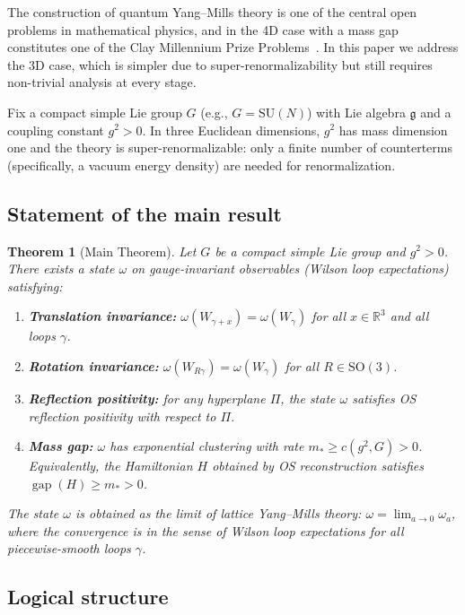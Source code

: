 \documentclass[11pt,a4paper]{article}
\theoremstyle{plain}
\newtheorem{theorem}{Theorem}[section]
\theoremstyle{definition}
\theoremstyle{remark}
\newcommand{\R}{\mathbb{R}}
\newcommand{\gap}{\operatorname{gap}}
\newcommand{\SU}{\mathrm{SU}}
\newcommand{\SO}{\mathrm{SO}}
\newcommand{\fg}{\mathfrak{g}}
\begin{document}
The construction of quantum Yang--Mills theory is one of
the central open problems in mathematical physics, and in
the 4D case with a mass gap constitutes one of the Clay
Millennium Prize Problems~\cite{JaffeWitten}. In this paper
we address the 3D case, which is simpler due to
super-renormalizability but still requires non-trivial
analysis at every stage.

Fix a compact simple Lie group $G$ (e.g., $G = \SU(N)$)
with Lie algebra $\fg$ and a coupling constant $g^2 > 0$.
In three Euclidean dimensions, $g^2$ has mass dimension one
and the theory is super-renormalizable: only a finite
number of counterterms (specifically, a vacuum energy
density) are needed for renormalization.

\subsection{Statement of the main result}

\begin{theorem}[Main Theorem]\label{thm:main}
Let $G$ be a compact simple Lie group and $g^2 > 0$.
There exists a state $\omega$ on gauge-invariant
observables (Wilson loop expectations) satisfying:
\begin{enumerate}[label=\textup{(OS\arabic*)},nosep]
  \item \textbf{Translation invariance:}
    $\omega(W_{\gamma + x}) = \omega(W_\gamma)$ for all
    $x \in \R^3$ and all loops $\gamma$.
  \item \textbf{Rotation invariance:}
    $\omega(W_{R\gamma}) = \omega(W_\gamma)$ for all
    $R \in \SO(3)$.
  \item \textbf{Reflection positivity:} for any
    hyperplane $\Pi$, the state $\omega$ satisfies
    OS reflection positivity with respect to $\Pi$.
  \item \textbf{Mass gap:}
    $\omega$ has exponential clustering with rate
    $m_* \ge c(g^2, G) > 0$. Equivalently, the
    Hamiltonian $H$ obtained by OS reconstruction
    satisfies $\gap(H) \ge m_* > 0$.
\end{enumerate}
The state $\omega$ is obtained as the limit of
lattice Yang--Mills theory:
$\omega = \lim_{a \to 0} \omega_a$,
where the convergence is in the sense of Wilson loop
expectations for all piecewise-smooth loops $\gamma$.
\end{theorem}

\subsection{Logical structure}
\end{document}
